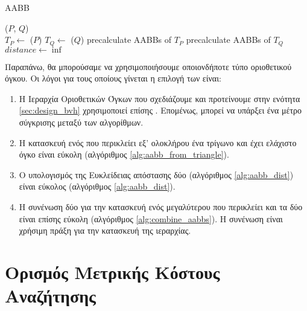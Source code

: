 \IncMargin{1.5em}
\begin{algorithm}[h]
    \caption[Απόσταση Τριγωνικών Πλεγμάτων με Πλήρη Αναζήτηση και ]{
         AABB
        }
    \label{alg:exhaustive_search_aabb}
    \DontPrintSemicolon
    \Indm\nonl\meshdist($P$, $Q$)\\
    \Indp
        $T_P \gets$ \trias($P$) \;
        $T_Q \gets$ \trias($Q$) \;
        precalculate AABBs of $T_P$\;
        precalculate AABBs of $T_Q$\; 
        $distance \gets \inf$ \;
\end{algorithm}
\DecMargin{1.5em}

Παραπάνω, θα μπορούσαμε να χρησιμοποιήσουμε οποιονδήποτε τύπο οριοθετικού όγκου.
Οι λόγοι για τους οποίους γίνεται η επιλογή των  είναι:
\begin{enumerate}
    \item Η Ιεραρχία Οριοθετικών Όγκων που σχεδιάζουμε και προτείνουμε 
    στην ενότητα \ref{sec:design_bvh} χρησιμοποιεί επίσης .
    Επομένως, μπορεί να υπάρξει ένα μέτρο σύγκρισης μεταξύ των 
    αλγορίθμων.
    \item Η κατασκευή ενός  
    που περικλείει εξ' ολοκλήρου ένα τρίγωνο και έχει ελάχιστο όγκο 
    είναι εύκολη (αλγόριθμος \ref{alg:aabb_from_triangle}).
    \item Ο υπολογισμός της Ευκλείδειας απόστασης 
    δύο  (αλγόριθμος \ref{alg:aabb_dist}) είναι 
    εύκολος (αλγόριθμος \ref{alg:aabb_dist}).
    \item Η συνένωση δύο  για την κατασκευή 
    ενός μεγαλύτερου που περικλείει και τα δύο είναι επίσης 
    εύκολη (αλγόριθμος \ref{alg:combine_aabbs}). 
    Η συνένωση είναι χρήσιμη πράξη για την κατασκευή της 
    ιεραρχίας. 
\end{enumerate}

\section{Ορισμός Μετρικής Κόστους Αναζήτησης}
\label{sec:cost_metric}

